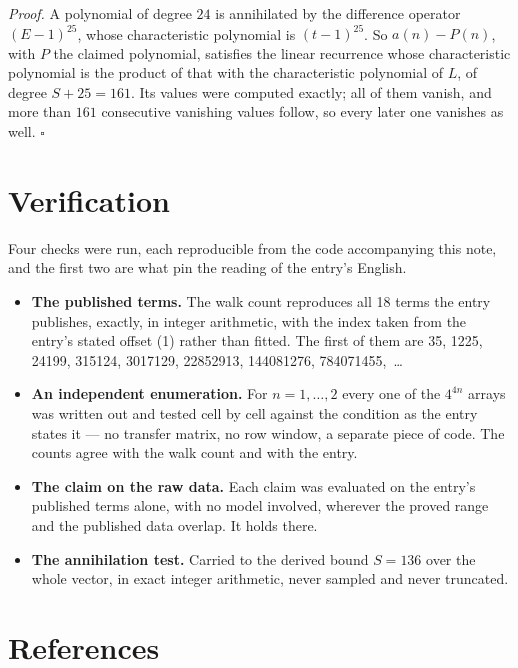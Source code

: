 \documentclass[11pt]{article}
\theoremstyle{definition}
\begin{document}
{\itshape Proof.} A polynomial of degree $24$ is annihilated by the difference operator $(E-1)^{25}$, whose characteristic polynomial is $(t-1)^{25}$. So $a(n) - P(n)$, with $P$ the claimed polynomial, satisfies the linear recurrence whose characteristic polynomial is the product of that with the characteristic polynomial of $L$, of degree $S + 25 = 161$. Its values were computed exactly; all of them vanish, and more than $161$ consecutive vanishing values follow, so every later one vanishes as well. $\square$

\section{Verification}

Four checks were run, each reproducible from the code accompanying this note, and the first two are what pin the reading of the entry's English.

\begin{itemize}

\item {\bfseries The published terms.} The walk count reproduces all 18 terms the entry publishes, exactly, in integer arithmetic, with the index taken from the entry's stated offset (1) rather than fitted. The first of them are 35, 1225, 24199, 315124, 3017129, 22852913, 144081276, 784071455,~\dots

\item {\bfseries An independent enumeration.} For $n = 1,\dots,2$ every one of the $4^{4n}$ arrays was written out and tested cell by cell against the condition as the entry states it --- no transfer matrix, no row window, a separate piece of code. The counts agree with the walk count and with the entry.

\item {\bfseries The claim on the raw data.} Each claim was evaluated on the entry's published terms alone, with no model involved, wherever the proved range and the published data overlap. It holds there.

\item {\bfseries The annihilation test.} Carried to the derived bound $S = 136$ over the whole vector, in exact integer arithmetic, never sampled and never truncated.

\end{itemize}

\section{References}
\end{document}
